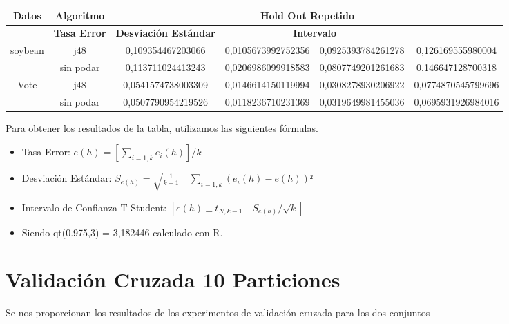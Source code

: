 \documentclass{article}
\begin{document}
\begin{table}[h]
	\begin{adjustbox}{center}
		\begin{tabular}{|c|c|c|c|c|c|}
			\hline
			\rowcolor[gray]{0.8}
			\textbf{Datos} & \textbf{Algoritmo} & \multicolumn{4}{|c|}{\textbf{Hold Out Repetido}} \\ \hline
			\rowcolor[gray]{0.8}			
			\multicolumn{2}{|c|}{\textbf{ }} & \textbf{Tasa Error} & \textbf{Desviación Estándar} & 			\multicolumn{2}{|c|}{\textbf{Intervalo}} \\ \hline
			
			soybean & j48 & 0,109354467203066 & 0,0105673992752356 & 0,0925393784261278 & 0,126169555980004\\ \hline
			 & sin podar	 & 0,113711024413243 & 0,0206986099918583 & 0,0807749201261683 & 0,146647128700318\\ \hline
			Vote	 & j48 & 0,0541574738003309 & 0,0146614150119994 & 0,0308278930206922 & 0,0774870545799696\\ \hline
			 & sin podar	 & 0,0507790954219526 & 0,0118236710231369 & 0,0319649981455036 & 0,0695931926984016\\ \hline
		\end{tabular}
	\end{adjustbox}
\end{table}

Para obtener los resultados de la tabla, utilizamos las siguientes fórmulas.
\begin{itemize}
	\item Tasa Error: \hspace{0.5cm}	 $e(h) = [\sum_{i = 1,k}e_i(h)] / k$
	\item Desviación Estándar: \hspace{0.5cm}	$S_{e(h)} = \sqrt{\frac{1}{k-1} \quad \sum_{i=1,k}{(e_i(h)-e(h))²}}$
	\item Intervalo de Confianza T-Student: \hspace{0.5cm}	$[e(h) \pm t_{N,k-1} \quad S_{e(h)}/\sqrt{k}]$
	\item Siendo \hspace{0.5cm} qt(0.975,3) = 3,182446 \hspace{0.5cm} calculado con R.

\end{itemize}


\newpage

\section{Validación Cruzada 10 Particiones}
Se nos proporcionan los resultados de los experimentos de validación cruzada para los dos conjuntos
\end{document}
